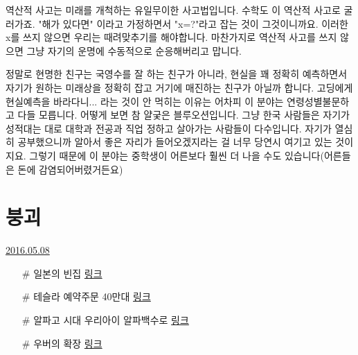 역산적 사고는 미래를 개척하는 유일무이한 사고법입니다.
수학도 이 역산적 사고로 굴러가죠. "해가 있다면" 이라고 가정하면서 "x=?"라고 잡는 것이 그것이니까요.
이러한 x를 쓰지 않으면 우리는 때려맞추기를 해야합니다.
마찬가지로 역산적 사고를 쓰지 않으면 그냥 자기의 운명에 수동적으로 순응해버리고 맙니다.
\vspace{5mm}

정말로 현명한 친구는 국영수를 잘 하는 친구가 아니라,
현실을 꽤 정확히 예측하면서 자기가 원하는 미래상을 정확히 잡고 거기에 매진하는 친구가 아닐까 합니다.
고딩에게 현실예측을 바라다니... 라는 것이 안 먹히는 이유는 어차피 이 분야는 연령성별불문하고 다들 모릅니다.
어떻게 보면 참 얄궂은 블루오션입니다. 그냥 한국 사람들은 자기가 성적대는 대로 대학과 전공과 직업 정하고 살아가는 사람들이 다수입니다.
자기가 열심히 공부했으니까 알아서 좋은 자리가 들어오겠지라는 걸 너무 당연시 여기고 있는 것이지요.
그렇기 때문에 이 분야는 중학생이 어른보다 훨씬 더 나을 수도 있습니다(어른들은 돈에 감염되어버렸거든요)
\vspace{5mm}




\section{붕괴}
\href{https://www.kockoc.com/Apoc/765536}{2016.05.08}

\vspace{5mm}

\begin{itemize}
    
    \item[$\#$] 일본의 빈집
    \href{http://news.naver.com/main/read.nhn?mode=LSD&mid=sec&sid1=104&oid=023&aid=0003171704}{링크}
    \vspace{5mm}
    
    \item[$\#$] 테슬라 예약주문 40만대
    \href{http://news.naver.com/main/read.nhn?mode=LSD&mid=shm&sid1=103&oid=020&aid=0002970286}{링크}
    \vspace{5mm}
    
    \item[$\#$] 알파고 시대 우리아이 알파백수로
    \href{http://news.naver.com/main/read.nhn?mode=LSD&mid=shm&sid1=105&oid=023&aid=0003170802}{링크}
    \vspace{5mm}
    
    \item[$\#$] 우버의 확장
    \href{http://news.naver.com/main/read.nhn?mode=LSD&mid=shm&sid1=104&oid=001&aid=0008384770}{링크}
\end{itemize}
\vspace{5mm}


